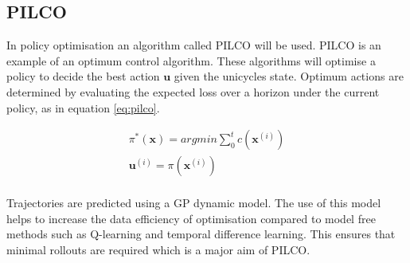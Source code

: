 \documentclass[twoside,twocolumn,12pt]{article}
\begin{document}
\subsection{PILCO}
In policy optimisation an algorithm called PILCO \cite{pilco} will be used.
PILCO is an example of an optimum control algorithm. These algorithms will optimise a policy to decide the best action $\textbf{u}$ given the unicycles state.
Optimum actions are determined by evaluating the expected loss over a horizon under the current policy, as in equation \ref{eq:pilco}. 

\begin{equation}
\begin{split}
\pi^*(\textbf{x}) = argmin \sum_0^tc(\textbf{x}^{(i)}) \\
\textbf{u}^{(i)} = \pi(\textbf{x}^{(i)} )\\
\end{split}
\label{eq:pilco}
\end{equation}

Trajectories are predicted using a GP dynamic model. The use of this model helps to increase the data efficiency of optimisation compared to model free methods such as Q-learning and temporal difference learning. This ensures that minimal rollouts are required which is a major aim of PILCO.
\end{document}
